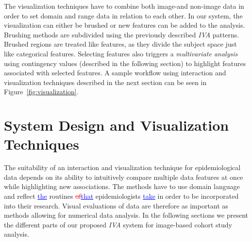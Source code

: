 \documentclass[journal]{style/vgtc} 			          %
\newcommand{\rem}[1]{\textcolor{red}{\sout{#1}}}
\newcommand{\add}[1]{\textcolor{blue}{\uline{#1}}}
\begin{document}
%
The visualization techniques have to combine both image-and non-image data in order to set domain and range data in relation to each other.
%
In our system, the visualization can either be brushed or new features can be added to the analysis. 
%
Brushing methods are subdivided using the previously described \emph{IVA} patterns.
%
Brushed regions are treated like features, as they divide the subject space just like categorical features.
%
Selecting features also triggers a \emph{multivariate analysis} using contingency values (described in the following section) to highlight features associated with selected features.
%
A sample workflow using interaction and visualization techniques described in the next section can be seen in Figure~\ref{fig:visualization}.

\section{System Design and Visualization Techniques} \label{Interaction- and Visualization Techniques}
%
The suitability of an interaction and visualization technique for epidemiological data depends on its ability to intuitively compare multiple data features at once while highlighting new associations.
%
The methods have to use domain language and reflect \add{the} routines \rem{of}\add{that} epidemiologists \add{take} in order to be incorporated into their research.
%
Visual evaluations of data are therefore as important as methods allowing for numerical data analysis.
%
In the following sections we present the different parts of our proposed \emph{IVA} system for image-based cohort study analysis.
\end{document}

